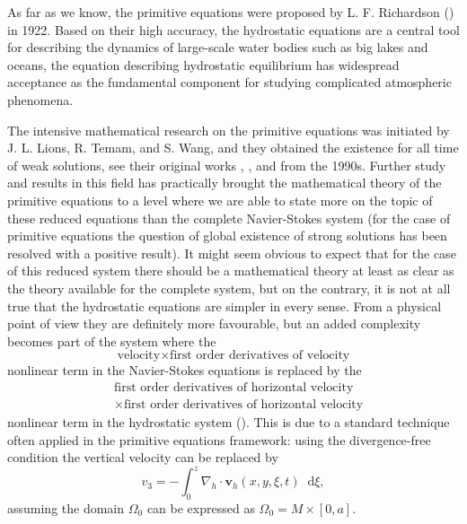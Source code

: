 \documentclass[12pt]{report}
\numberwithin{theorem}{chapter}
\numberwithin{corollary}{chapter}
\numberwithin{lemma}{chapter}
\numberwithin{remark}{chapter}
\numberwithin{definition}{chapter}
\numberwithin{prop}{chapter}
\newcommand*\diff{\mathop{}\!\mathrm{d}}
\begin{document}
As far as we know, the primitive equations were proposed by L. F. Richardson (\cite{lions1992new}) in 1922. Based on their high accuracy, the hydrostatic equations are a central tool for describing the dynamics of large-scale water bodies such as big lakes and oceans, the equation describing hydrostatic equilibrium has widespread acceptance as the fundamental component for studying complicated atmospheric phenomena.

The intensive mathematical research on the primitive equations was initiated by J. L. Lions, R. Temam, and S. Wang, and they obtained the existence for all time of weak solutions, see their original works \cite{lions1992new}, \cite{lions1992equations}, and \cite{lions1995mathematical} from the 1990s. Further study and results in this field has practically brought the mathematical theory of the primitive equations to a level where we are able to state more on the topic of these reduced equations than the complete Navier-Stokes system (for the case of primitive equations the question of global existence of strong solutions has been resolved with a positive result). It might seem obvious to expect that for the case of this reduced system there should be a mathematical theory at least as clear as the theory available for the complete system, but on the contrary, it is not at all true that the hydrostatic equations are simpler in every sense. From a physical point of view they are definitely more favourable, but an added complexity becomes part of the system where the
%
\begin{equation} \text{velocity} \times \text{first order derivatives of velocity}\end{equation}
%
nonlinear term in the Navier-Stokes equations is replaced by the
%
\begin{equation}
  \begin{split}
    & \text{first order derivatives of horizontal velocity} \\
    & \times \text{first order derivatives of horizontal velocity}
  \end{split}
\end{equation}
%
nonlinear term in the hydrostatic system (\cite{temam2005some}). This is due to a standard technique often applied in the primitive equations framework: using the divergence-free condition the vertical velocity can be replaced by
%
\begin{equation}
  v_3 = - \int_0^z \nabla_h \cdot \mathbf{v}_h (x, y, \xi, t) \diff \xi,
\end{equation}
%
assuming the domain $\Omega_0$ can be expressed as $\Omega_0 = M \times [0, a].$
\end{document}
